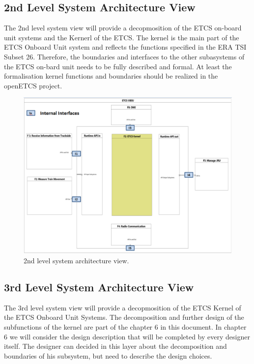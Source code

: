 \subsection{2nd Level System Architecture View}
The 2nd level system view will provide a decopmosition of the ETCS on-board unit systems and the Kernerl of the ETCS. The kernel is the main part of the ETCS Onboard Unit system and reflects the functions specified in the ERA TSI Subset 26. Therefore, the boundaries and interfaces to the other subasystems of the ETCS on-bard unit needs to be fully described and formal. At least the formalisation kernel functions and boundaries should be realized in the openETCS project.

\begin{figure}
\centering
\includegraphics[scale=0.6]{images/2ndlevelarchitecture}
\caption{2nd level system architecture view.}
\label{2nd level System Architecture view}
\end{figure}

\subsection{3rd Level System Architecture View}
The 3rd level system view will provide a decopmosition of the ETCS Kernel of the ETCS Onboard Unit Systems. The decomposition and further design of the subfunctions of the kernel are part of the chapter 6 in this document. In chapter 6 we will consider the design description that will be completed by every designer itself. The designer can decided in this layer about the decomposition and boundaries of his subsystem, but need to describe the design choices.


